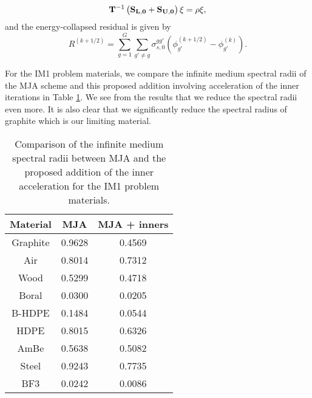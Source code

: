 \begin{enumerate}
\begin{enumerate}
		\begin{equation*}
	        {\bf T}^{-1} \left( {\bf S_{L,0}} + {\bf S_{U,0}} \right)\xi = \rho \xi ,
	        \end{equation*}
		  and the energy-collapsed residual is given by
		  \begin{equation*}
	        R^{(k+1/2)} = \sum_{g=1}^{G} \sum_{g' \neq g} \sigma_{s,0}^{gg'} \left( \phi_{g'}^{(k+1/2)} - \phi_{g'}^{(k)}\right).
	        \end{equation*}
	\end{enumerate}
For the IM1 problem materials, we compare the infinite medium spectral radii of the MJA scheme and this proposed addition involving acceleration of the inner iterations in Table \ref{tab::Conc_MJA_inners}. We see from the results that we reduce the spectral radii even more. It is also clear that we significantly reduce the spectral radius of graphite which is our limiting material.
\begin{table}
\caption{Comparison of the infinite medium spectral radii between MJA and the proposed addition of the inner acceleration for the IM1 problem materials.}
\begin{center}
\def\arraystretch{1.6}
\begin{tabular}{|c|c|c|}
\hline
Material & MJA & MJA + inners \\\hline \hline
Graphite&0.9628&0.4569\\\hline
Air&0.8014&0.7312\\\hline
Wood&0.5299&0.4718\\\hline
Boral&0.0300&0.0205\\\hline
B-HDPE&0.1484&0.0544\\\hline
HDPE&0.8015&0.6326\\\hline
AmBe&0.5638&0.5082\\\hline
Steel&0.9243&0.7735\\\hline
BF3&0.0242&0.0086\\\hline
\end{tabular}
\end{center}
\label{tab::Conc_MJA_inners}
\end{table}
\fi
\end{enumerate}